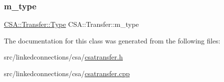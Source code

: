 \mbox{\label{classCSA_1_1Transfer_a491227791f327d6a2a19ce6e91db37f6}} 
\subsubsection{\texorpdfstring{m\+\_\+type}{m\_type}}
{\footnotesize\ttfamily \mbox{\hyperlink{classCSA_1_1Transfer_a827daaa28edc2c4b10ddfa70762355ea}{C\+S\+A\+::\+Transfer\+::\+Type}} C\+S\+A\+::\+Transfer\+::m\+\_\+type\hspace{0.3cm}{\ttfamily [private]}}



The documentation for this class was generated from the following files\+:\begin{DoxyCompactItemize}
\item 
src/linkedconnections/csa/\mbox{\hyperlink{csatransfer_8h}{csatransfer.\+h}}\item 
src/linkedconnections/csa/\mbox{\hyperlink{csatransfer_8cpp}{csatransfer.\+cpp}}\end{DoxyCompactItemize}
